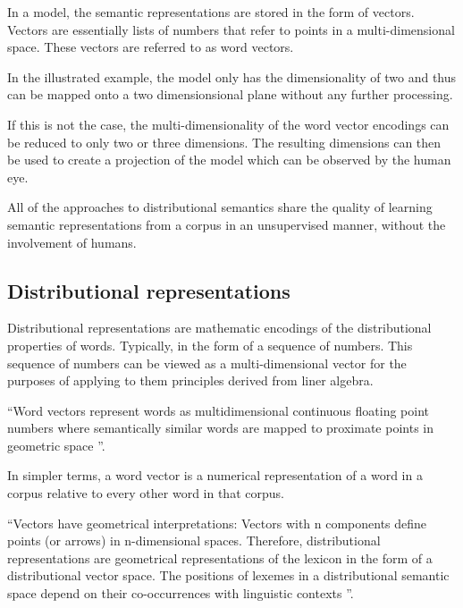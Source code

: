 \documentclass[14pt, a4paper]{extreport}
\begin{document}
In a model, the semantic representations are stored in the form of vectors. Vectors are essentially lists of numbers that refer to points in a multi-dimensional space. These vectors are referred to as word vectors.

In the illustrated example, the model only has the dimensionality of two and thus can be mapped onto a two dimensionsional plane without any further processing.

If this is not the case, the multi-dimensionality of the word vector encodings can be reduced to only two or three dimensions. The resulting dimensions can then be used to create a projection of the model which can be observed by the human eye.

All of the approaches to distributional semantics share the quality of learning semantic representations from a corpus in an unsupervised manner, without the involvement of humans.
    \subsection{Distributional representations}
Distributional representations are mathematic encodings of the distributional properties of words. Typically, in the form of a sequence of numbers. This sequence of numbers can be viewed as a multi-dimensional vector for the purposes of applying to them principles derived from liner algebra.

``Word vectors represent words as multidimensional continuous floating point numbers where semantically similar words are mapped to proximate points in geometric space \parencite{ahireintro}''.

In simpler terms, a word vector is a numerical representation of a word in a corpus relative to every other word in that corpus.


``Vectors have geometrical interpretations: Vectors with n components define points (or arrows) in n-dimensional spaces. Therefore, distributional representations are geometrical representations of the lexicon in the form of a distributional vector space. The positions of lexemes in a distributional semantic space depend on their co-occurrences with linguistic contexts \parencite{lenci}''.
\end{document}
